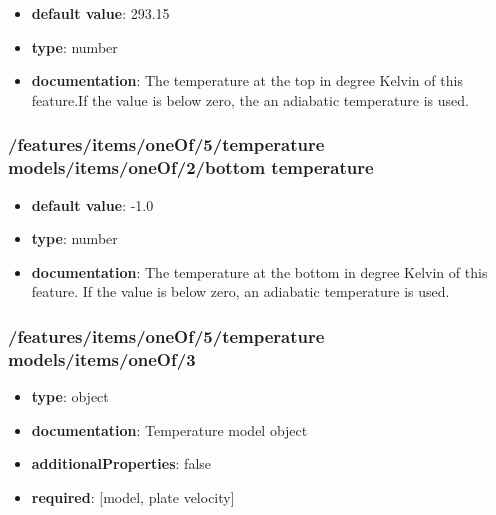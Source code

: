 \begin{itemize}\item {\bf default value}: 293.15
\item {\bf type}: number
\item {\bf documentation}: The temperature at the top in degree Kelvin of this feature.If the value is below zero, the an adiabatic temperature is used.
\end{itemize}\subsubsection{/features/items/oneOf/5/temperature models/items/oneOf/2/bottom temperature}
\begin{itemize}\item {\bf default value}: -1.0
\item {\bf type}: number
\item {\bf documentation}: The temperature at the bottom in degree Kelvin of this feature. If the value is below zero, an adiabatic temperature is used.
\end{itemize}\subsubsection{/features/items/oneOf/5/temperature models/items/oneOf/3}
\begin{itemize}\item {\bf type}: object
\item {\bf documentation}: Temperature model object
\item {\bf additionalProperties}: false
\item {\bf required}: [model, plate velocity]\end{itemize}
